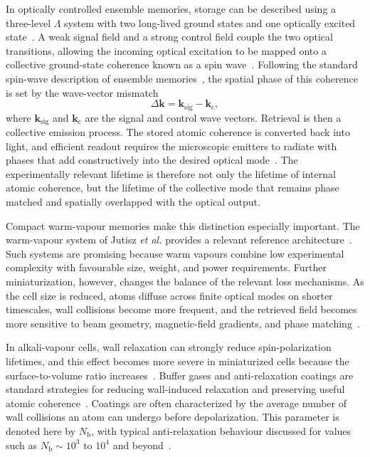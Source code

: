 In optically controlled ensemble memories, storage can be described using a three-level $\Lambda$ system with two long-lived ground states and one optically excited state~\cite{Qmeaara_HeshamiEtAl_2016,QmfpDp_FleischhauerEtAl_2002}. A weak signal field and a strong control field couple the two optical transitions, allowing the incoming optical excitation to be mapped onto a collective ground-state coherence known as a spin wave~\cite{QmfpDp_FleischhauerEtAl_2002,Qmeaara_HeshamiEtAl_2016}. Following the standard spin-wave description of ensemble memories~\cite{QmfpDp_FleischhauerEtAl_2002,Qmeaara_HeshamiEtAl_2016}, the spatial phase of this coherence is set by the wave-vector mismatch
%
\begin{equation}
    \Delta\mathbf{k}
    =
    \mathbf{k}_{\mathrm{sig}}
    -
    \mathbf{k}_{\mathrm{c}},
    \label{eq:intro_spin_wave_wavevector}
\end{equation}
%
where $\mathbf{k}_{\mathrm{sig}}$ and $\mathbf{k}_{\mathrm{c}}$ are the signal and control wave vectors. Retrieval is then a collective emission process. The stored atomic coherence is converted back into light, and efficient readout requires the microscopic emitters to radiate with phases that add constructively into the desired optical mode~\cite{QmfpDp_FleischhauerEtAl_2002,Qmeaara_HeshamiEtAl_2016}. The experimentally relevant lifetime is therefore not only the lifetime of internal atomic coherence, but the lifetime of the collective mode that remains phase matched and spatially overlapped with the optical output.

Compact warm-vapour memories make this distinction especially important. The  warm-vapour system of Jutisz \emph{et al.} provides a relevant reference architecture~\cite{Smqms_JutiszEtAl_2025}. Such systems are promising because warm vapours combine low experimental complexity with favourable size, weight, and power requirements. Further miniaturization, however, changes the balance of the relevant loss mechanisms. As the cell size is reduced, atoms diffuse across finite optical modes on shorter timescales, wall collisions become more frequent, and the retrieved field becomes more sensitive to beam geometry, magnetic-field gradients, and phase matching~\cite{Smqms_JutiszEtAl_2025,Qmeaara_HeshamiEtAl_2016}.

In alkali-vapour cells, wall relaxation can strongly reduce spin-polarization lifetimes, and this effect becomes more severe in miniaturized cells because the surface-to-volume ratio increases~\cite{ChiEtAl_2020}. Buffer gases and anti-relaxation coatings are standard strategies for reducing wall-induced relaxation and preserving useful atomic coherence~\cite{ChiEtAl_2020,Happer_1972}. Coatings are often characterized by the average number of wall collisions an atom can undergo before depolarization. This parameter is denoted here by \(N_{\mathrm{b}}\), with typical anti-relaxation behaviour discussed for values such as \(N_{\mathrm{b}}\sim10^3\) to \(10^4\) and beyond~\cite{ChiEtAl_2020,Happer_1972}.

